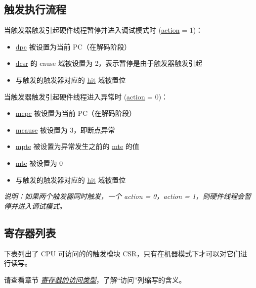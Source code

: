\documentclass[main\_\_CN.tex]{subfiles}
\begin{document}
\subsection{触发执行流程}
\label{sec:riscvcpu-hwt-suggest-op}

当触发器触发引起硬件线程暂停并进入调试模式时 (\hyperref[fielddesc:MCONTROLACTION]{action} = 1)：
\begin{itemize}
    \item \hyperref[regdesc:DPC]{dpc} 被设置为当前 PC（在解码阶段）
    \item \hyperref[regdesc:DCSR]{dcsr} 的 cause 域被设置为 2，表示暂停是由于触发器触发引起
    \item 与触发的触发器对应的 \hyperref[fielddesc:MCONTROLHIT]{hit} 域被置位
\end{itemize}

当触发器触发引起硬件线程进入异常时 (\hyperref[fielddesc:MCONTROLACTION]{action} = 0)：
\begin{itemize}
    \item \hyperref[regdesc:MEPC]{mepc} 被设置为当前 PC（在解码阶段）
    \item \hyperref[regdesc:MCAUSE]{mcause} 被设置为 3，即断点异常
    \item \hyperref[fielddesc:TCONTROLMPTE]{mpte} 被设置为异常发生之前的 \hyperref[fielddesc:TCONTROLMTE]{mte} 的值
    \item \hyperref[fielddesc:TCONTROLMTE]{mte} 被设置为 0
    \item 与触发的触发器对应的 \hyperref[fielddesc:MCONTROLHIT]{hit} 域被置位
\end{itemize}

\textit{说明：如果两个触发器同时触发，一个 action = 0，action = 1，则硬件线程会暂停并进入调试模式。}


\hypertarget{riscvcpu-hwt-reg-summ}{}
\subsection{寄存器列表}
\label{sec:riscvcpu-hwt-reg-summ}


下表列出了 CPU 可访问的的触发模块 CSR，只有在机器模式下才可以对它们进行读写。

请查看章节 \hyperref[glossary-access-types]{\textit{寄存器的访问类型}}，了解“访问”列缩写的含义。


\end{document}
